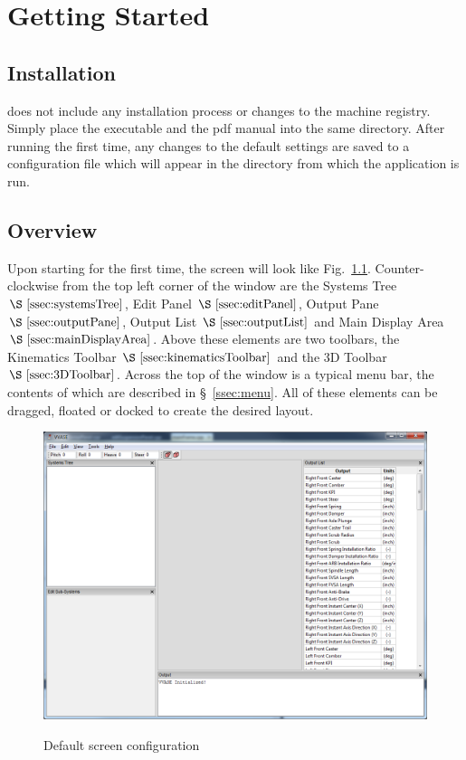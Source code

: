 \chapter{Getting Started} \label{ch:gettingStarted}

\section{Installation} \label{sec:installation}

\vvase{} does not include any installation process or changes to the machine registry.  Simply place the executable and the pdf manual into the same directory.  After running the first time, any changes to the default settings are saved to a configuration file which will appear in the directory from which the application is run.

\section{Overview} \label{sec:overview}

Upon starting \vvase{} for the first time, the screen will look like Fig.~\ref{fig:defaultStartup}.  Counter-clockwise from the top left corner of the window are the Systems Tree \(\S~\ref{ssec:systemsTree}\), Edit Panel \(\S~\ref{ssec:editPanel}\), Output Pane \(\S~\ref{ssec:outputPane}\), Output List \(\S~\ref{ssec:outputList}\) and Main Display Area \(\S~\ref{ssec:mainDisplayArea}\).  Above these elements are two toolbars, the Kinematics Toolbar \(\S~\ref{ssec:kinematicsToolbar}\) and the 3D Toolbar \(\S~\ref{ssec:3DToolbar}\).  Across the top of the window is a typical menu bar, the contents of which are described in \S~\ref{ssec:menu}.  All of these elements can be dragged, floated or docked to create the desired layout.

\begin{figure}
\includegraphics[width=\textwidth]{images/defaultStartup} \label{fig:defaultStartup}
\caption{Default screen configuration}
\centering
\end{figure}

